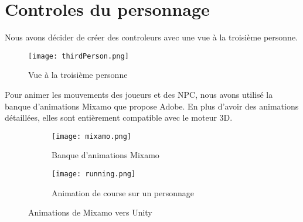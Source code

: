 \documentclass[../doc.tex ]{subfiles}
\begin{document}
\section{Controles du personnage}
Nous avons décider de créer des controleurs avec une vue à la troisième personne.
\begin{figure}[hbt!]
    \centering
    \texttt{[image: thirdPerson.png]}
    \caption{Vue à la troisième personne}
\end{figure}
Pour animer les mouvements des joueurs et des NPC, nous avons utilisé la banque d'animations Mixamo que propose Adobe.
En plus d'avoir des animations détaillées, elles sont entièrement compatible avec le moteur 3D.
\begin{figure}[hbt!]
    \centering
    \begin{subfigure}[b]{0.3\textwidth}
        \texttt{[image: mixamo.png]} 
        \caption{Banque d'animations Mixamo}
    \end{subfigure}
    \hfill
    \begin{subfigure}[b]{0.3\textwidth}
        \texttt{[image: running.png]} 
        \caption{Animation de course sur un personnage}
    \end{subfigure}
    \caption{Animations de Mixamo vers Unity}
\end{figure}
\end{document}
